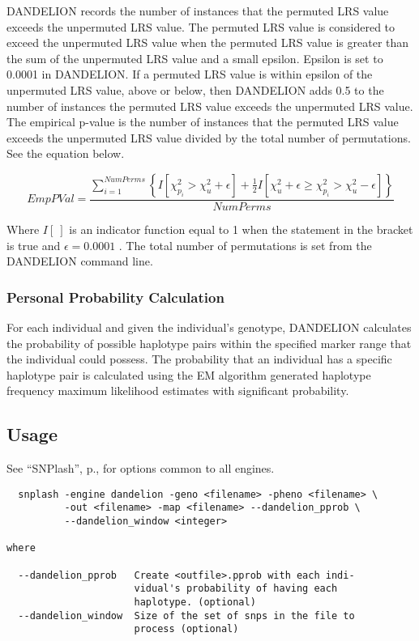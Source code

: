 DANDELION records the number of instances that the permuted LRS value exceeds
the unpermuted LRS value.  The permuted LRS value is considered to exceed the
unpermuted LRS value when the permuted LRS value is greater than the sum of the
unpermuted LRS value and a small epsilon.  Epsilon is set to 0.0001 in
DANDELION.  If a permuted LRS value is within epsilon of the unpermuted LRS
value, above or below, then DANDELION adds 0.5 to the number of instances the
permuted LRS value exceeds the unpermuted LRS value.  The empirical p-value is
the number of instances that the permuted LRS value exceeds the unpermuted LRS
value divided by the total number of permutations.  See the equation below.

\begin{equation*}
  EmpPVal = \frac{\displaystyle\sum_{i=1}^{NumPerms}\left\{ I\left[ \chi_{p_i}^2 > \chi_u^2 +\epsilon \right] + \frac{1}{2}I\left[ \chi_u^2 + \epsilon \geq \chi_{p_i}^2 > \chi_u^2 - \epsilon \right] \right\} }
                 {NumPerms}
\end{equation*}

\noindent{}Where $I\left[~\right]$ is an indicator function equal to 1 when the
statement in the bracket is true and $\epsilon=0.0001$ .  The total number of permutations is set
from the DANDELION command line.

\subsubsection{Personal Probability Calculation}
For each individual and given the individual's genotype, DANDELION calculates the
probability of possible haplotype pairs within the specified marker range that
the individual could possess.  The probability that an individual has a specific
haplotype pair is calculated using the EM algorithm generated haplotype
frequency maximum likelihood estimates with significant probability.


\subsection{Usage}
\label{sec:usage}
See ``SNPlash'', p.\pageref{sec:snplash}, for options common to all engines.

\begin{verbatim}
  snplash -engine dandelion -geno <filename> -pheno <filename> \
          -out <filename> -map <filename> --dandelion_pprob \
          --dandelion_window <integer>

where

  --dandelion_pprob   Create <outfile>.pprob with each indi-
                      vidual's probability of having each 
                      haplotype. (optional)
  --dandelion_window  Size of the set of snps in the file to
                      process (optional)
\end{verbatim}


